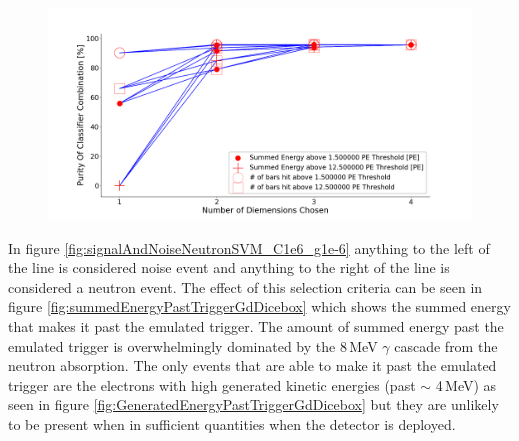 \begin{figure}[htbp]
\centering
\includegraphics[width=\linewidth]{Chapter4/Figs/Raster/purNeutronSVMC1e6_g1e-6.png}
\label{fig:purNeutronSVMC1e6_g1e-6}
\end{figure}

In figure \ref{fig:signalAndNoiseNeutronSVM_C1e6_g1e-6} anything to the left of the line is considered noise event and anything to the right of the line is considered a neutron event. The effect of this selection criteria can be seen in figure \ref{fig:summedEnergyPastTriggerGdDicebox} which shows the summed energy that makes it past the emulated trigger. The amount of summed energy past the emulated trigger is overwhelmingly dominated by the 8\,MeV $\gamma$ cascade from the neutron absorption. The only events that are able to make it past the emulated trigger are the electrons with high generated kinetic energies (past $\sim$ 4\,MeV) as seen in figure \ref{fig:GeneratedEnergyPastTriggerGdDicebox} but they are unlikely to be present when in sufficient quantities when the detector is deployed. 

